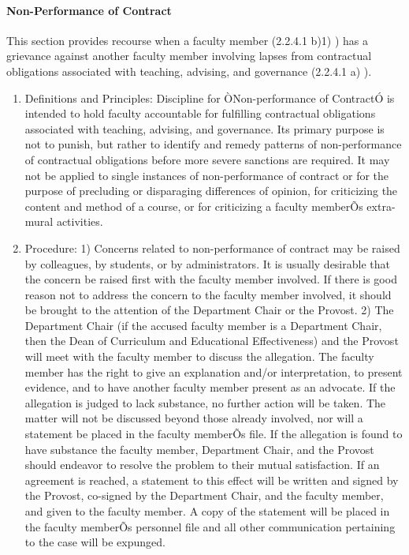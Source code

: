 \documentclass[letterpaper, 11pt]{article}
\begin{document}
			\paragraph{Non-Performance of Contract}
				This section provides recourse when a faculty member (2.2.4.1 b)1) ) has a grievance against another faculty member involving lapses from contractual obligations associated with teaching, advising, and governance (2.2.4.1 a) ).
				\begin{enumerate}[label=\alph*)]
					\item{Definitions and Principles:}
					Discipline for ÒNon-performance of ContractÓ is intended to hold faculty accountable for fulfilling contractual obligations associated with teaching, advising, and governance.  Its primary purpose is not to punish, but rather to identify and remedy patterns of non-performance of contractual obligations before more severe sanctions are required.
					It may not be applied to single instances of non-performance of contract or for the purpose of precluding or disparaging differences of opinion, for criticizing the content and method of a course, or for criticizing a faculty memberÕs extra-mural activities.
					\item{Procedure:}
					1) Concerns related to non-performance of contract may be raised by colleagues, by students, or by administrators.  It is usually desirable that the concern be raised first with the faculty member involved.  If there is good reason not to address the concern to the faculty member involved, it should be brought to the attention of the Department Chair or the Provost.
					2) The Department Chair (if the accused faculty member is a Department Chair, then the Dean of Curriculum and Educational Effectiveness) and the Provost will meet with the faculty member to discuss the allegation.  The faculty member has the right to give an explanation and/or interpretation, to present evidence, and to have another faculty member present as an advocate.  If the allegation is judged to lack substance, no further action will be taken.  The matter will not be discussed beyond those already involved, nor will a statement be placed in the faculty memberÕs file.  If the allegation is found to have substance the faculty member, Department Chair, and the Provost should endeavor to resolve the problem to their mutual satisfaction.  If an agreement is reached, a statement to this effect will be written and signed by the Provost, co-signed by the Department Chair, and the faculty member, and given to the faculty member.  A copy of the statement will be placed in the faculty memberÕs personnel file and all other communication pertaining to the case will be expunged.

\end{enumerate}
\end{document}
